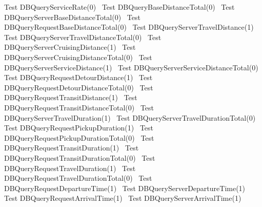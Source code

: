 \documentclass{article}
\def\nwendcode{\endtrivlist \endgroup}
\let\nwdocspar=\par
\begin{document}
\LA{}Test \code{}DBQueryServiceRate\edoc{}(0)~{\nwtagstyle{}}\RA{}
\LA{}Test \code{}DBQueryBaseDistanceTotal\edoc{}(0)~{\nwtagstyle{}}\RA{}
\LA{}Test \code{}DBQueryServerBaseDistanceTotal\edoc{}(0)~{\nwtagstyle{}}\RA{}
\LA{}Test \code{}DBQueryRequestBaseDistanceTotal\edoc{}(0)~{\nwtagstyle{}}\RA{}
\LA{}Test \code{}DBQueryServerTravelDistance\edoc{}(1)~{\nwtagstyle{}}\RA{}
\LA{}Test \code{}DBQueryServerTravelDistanceTotal\edoc{}(0)~{\nwtagstyle{}}\RA{}
\LA{}Test \code{}DBQueryServerCruisingDistance\edoc{}(1)~{\nwtagstyle{}}\RA{}
\LA{}Test \code{}DBQueryServerCruisingDistanceTotal\edoc{}(0)~{\nwtagstyle{}}\RA{}
\LA{}Test \code{}DBQueryServerServiceDistance\edoc{}(1)~{\nwtagstyle{}}\RA{}
\LA{}Test \code{}DBQueryServerServiceDistanceTotal\edoc{}(0)~{\nwtagstyle{}}\RA{}
\LA{}Test \code{}DBQueryRequestDetourDistance\edoc{}(1)~{\nwtagstyle{}}\RA{}
\LA{}Test \code{}DBQueryRequestDetourDistanceTotal\edoc{}(0)~{\nwtagstyle{}}\RA{}
\LA{}Test \code{}DBQueryRequestTransitDistance\edoc{}(1)~{\nwtagstyle{}}\RA{}
\LA{}Test \code{}DBQueryRequestTransitDistanceTotal\edoc{}(0)~{\nwtagstyle{}}\RA{}
\LA{}Test \code{}DBQueryServerTravelDuration\edoc{}(1)~{\nwtagstyle{}}\RA{}
\LA{}Test \code{}DBQueryServerTravelDurationTotal\edoc{}(0)~{\nwtagstyle{}}\RA{}
\LA{}Test \code{}DBQueryRequestPickupDuration\edoc{}(1)~{\nwtagstyle{}}\RA{}
\LA{}Test \code{}DBQueryRequestPickupDurationTotal\edoc{}(0)~{\nwtagstyle{}}\RA{}
\LA{}Test \code{}DBQueryRequestTransitDuration\edoc{}(1)~{\nwtagstyle{}}\RA{}
\LA{}Test \code{}DBQueryRequestTransitDurationTotal\edoc{}(0)~{\nwtagstyle{}}\RA{}
\LA{}Test \code{}DBQueryRequestTravelDuration\edoc{}(1)~{\nwtagstyle{}}\RA{}
\LA{}Test \code{}DBQueryRequestTravelDurationTotal\edoc{}(0)~{\nwtagstyle{}}\RA{}
\LA{}Test \code{}DBQueryRequestDepartureTime\edoc{}(1)~{\nwtagstyle{}}\RA{}
\LA{}Test \code{}DBQueryServerDepartureTime\edoc{}(1)~{\nwtagstyle{}}\RA{}
\LA{}Test \code{}DBQueryRequestArrivalTime\edoc{}(1)~{\nwtagstyle{}}\RA{}
\LA{}Test \code{}DBQueryServerArrivalTime\edoc{}(1)~{\nwtagstyle{}}\RA{}
\nwendcode{}\nwdocspar
\end{document}
